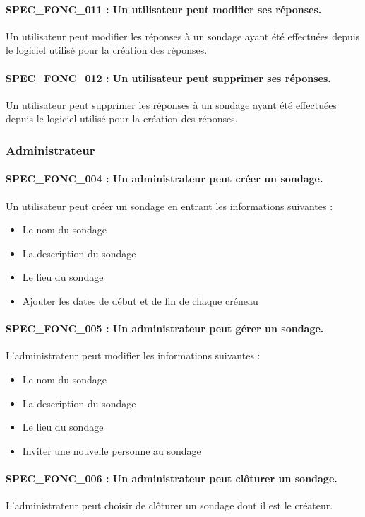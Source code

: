 \documentclass[titlepage]{report}
\begin{document}
\paragraph{SPEC\_FONC\_011 : Un utilisateur peut modifier ses réponses.}
Un utilisateur peut modifier les réponses à un sondage ayant été effectuées depuis le logiciel utilisé pour la création des réponses.

\paragraph{SPEC\_FONC\_012 : Un utilisateur peut supprimer ses réponses.}
Un utilisateur peut supprimer les réponses à un sondage ayant été effectuées depuis le logiciel utilisé pour la création des réponses.

\subsubsection{Administrateur}

\paragraph{SPEC\_FONC\_004 : Un administrateur peut créer un sondage.}
Un utilisateur peut créer un sondage en entrant les informations suivantes :
\begin{itemize}
\item Le nom du sondage 
\item La description du sondage
\item Le lieu du sondage
\item Ajouter les dates de début et de fin de chaque créneau  \end{itemize}

\paragraph{SPEC\_FONC\_005 : Un administrateur peut gérer un sondage.}
L’administrateur peut modifier les informations suivantes :
\begin{itemize}
\item Le nom du sondage
\item La description du sondage
\item Le lieu du sondage
\item Inviter une nouvelle personne au sondage \end{itemize}

\paragraph{SPEC\_FONC\_006 : Un administrateur peut clôturer un sondage. }
L’administrateur peut choisir de clôturer un sondage dont il est le créateur.
\end{document}
